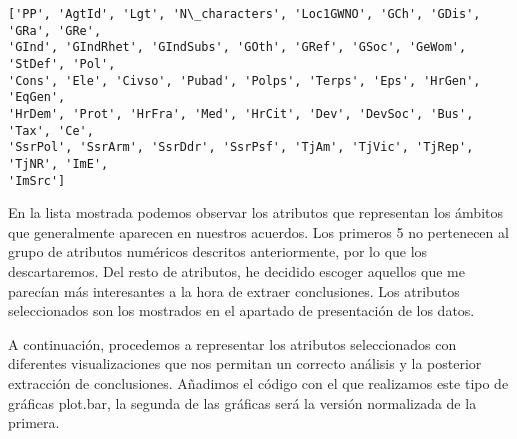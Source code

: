 \documentclass[11pt]{article}
\begin{document}
    \begin{Verbatim}[commandchars=\\\{\}]
['PP', 'AgtId', 'Lgt', 'N\_characters', 'Loc1GWNO', 'GCh', 'GDis', 'GRa', 'GRe',
'GInd', 'GIndRhet', 'GIndSubs', 'GOth', 'GRef', 'GSoc', 'GeWom', 'StDef', 'Pol',
'Cons', 'Ele', 'Civso', 'Pubad', 'Polps', 'Terps', 'Eps', 'HrGen', 'EqGen',
'HrDem', 'Prot', 'HrFra', 'Med', 'HrCit', 'Dev', 'DevSoc', 'Bus', 'Tax', 'Ce',
'SsrPol', 'SsrArm', 'SsrDdr', 'SsrPsf', 'TjAm', 'TjVic', 'TjRep', 'TjNR', 'ImE',
'ImSrc']
    \end{Verbatim}

    En la lista mostrada podemos observar los atributos que representan los
ámbitos que generalmente aparecen en nuestros acuerdos. Los
primeros 5 no pertenecen al grupo de atributos numéricos
descritos anteriormente, por lo que los descartaremos. Del resto de
atributos, he decidido escoger aquellos que me parecían más interesantes
a la hora de extraer conclusiones. Los atributos seleccionados son los
mostrados en el apartado de presentación de los datos.

A continuación, procedemos a representar los atributos seleccionados con
diferentes visualizaciones que nos permitan un correcto análisis y la
posterior extracción de conclusiones. Añadimos el código con el que realizamos este tipo de gráficas plot.bar, la segunda de las gráficas será la versión normalizada de la primera.
\end{document}
